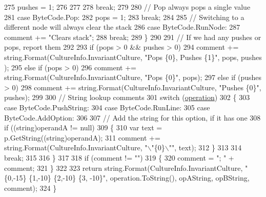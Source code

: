 \begin{DoxyCode}
275                         pushes = 1;
276 
277 
278                     \textcolor{keywordflow}{break};
279 
280                 \textcolor{comment}{// Pop always pops a single value}
281                 \textcolor{keywordflow}{case} ByteCode.Pop:
282                     pops = 1;
283                     \textcolor{keywordflow}{break};
284 
285                 \textcolor{comment}{// Switching to a different node will always clear the stack}
286                 \textcolor{keywordflow}{case} ByteCode.RunNode:
287                     comment += \textcolor{stringliteral}{"Clears stack"};
288                     \textcolor{keywordflow}{break};
289             \}
290 
291             \textcolor{comment}{// If we had any pushes or pops, report them}
292 
293             \textcolor{keywordflow}{if} (pops > 0 && pushes > 0)
294                 comment += string.Format(CultureInfo.InvariantCulture, \textcolor{stringliteral}{"Pops \{0\}, Pushes \{1\}"}, pops, pushes
      );
295             \textcolor{keywordflow}{else} \textcolor{keywordflow}{if} (pops > 0)
296                 comment += string.Format(CultureInfo.InvariantCulture, \textcolor{stringliteral}{"Pops \{0\}"}, pops);
297             \textcolor{keywordflow}{else} \textcolor{keywordflow}{if} (pushes > 0)
298                 comment += string.Format(CultureInfo.InvariantCulture, \textcolor{stringliteral}{"Pushes \{0\}"}, pushes);
299 
300             \textcolor{comment}{// String lookup comments}
301             \textcolor{keywordflow}{switch} (\hyperlink{a00113_a566bf5f7198cc353ea5c3710cb3a31cb}{operation})
302             \{
303                 \textcolor{keywordflow}{case} ByteCode.PushString:
304                 \textcolor{keywordflow}{case} ByteCode.RunLine:
305                 \textcolor{keywordflow}{case} ByteCode.AddOption:
306 
307                     \textcolor{comment}{// Add the string for this option, if it has one}
308                     \textcolor{keywordflow}{if} ((\textcolor{keywordtype}{string})operandA != null)
309                     \{
310                         var text = p.GetString((string)operandA);
311                         comment += string.Format(CultureInfo.InvariantCulture, \textcolor{stringliteral}{"\(\backslash\)"\{0\}\(\backslash\)""}, text);
312                     \}
313 
314                     \textcolor{keywordflow}{break};
315 
316             \}
317 
318             \textcolor{keywordflow}{if} (comment != \textcolor{stringliteral}{""})
319             \{
320                 comment = \textcolor{stringliteral}{"; "} + comment;
321             \}
322 
323             \textcolor{keywordflow}{return} string.Format(CultureInfo.InvariantCulture, \textcolor{stringliteral}{"\{0,-15\} \{1,-10\} \{2,-10\} \{3, -10\}"}, 
      operation.ToString(), opAString, opBString, comment);
324         \}
\end{DoxyCode}


